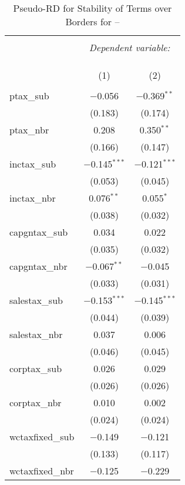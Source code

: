 
\begin{table}[!htbp] \centering 
  \caption{Pseudo-RD for Stability of Terms over Borders for  --} 
  \label{} 
\begin{tabular}{@{\extracolsep{5pt}}lcc} 
\\[-1.8ex]\hline 
\hline \\[-1.8ex] 
 & \multicolumn{2}{c}{\textit{Dependent variable:}} \\ 
\cline{2-3} 
\\[-1.8ex] & \multicolumn{2}{c}{ } \\ 
\\[-1.8ex] & (1) & (2)\\ 
\hline \\[-1.8ex] 
 ptax\_sub & $-$0.056 & $-$0.369$^{**}$ \\ 
  & (0.183) & (0.174) \\ 
  ptax\_nbr & 0.208 & 0.350$^{**}$ \\ 
  & (0.166) & (0.147) \\ 
  inctax\_sub & $-$0.145$^{***}$ & $-$0.121$^{***}$ \\ 
  & (0.053) & (0.045) \\ 
  inctax\_nbr & 0.076$^{**}$ & 0.055$^{*}$ \\ 
  & (0.038) & (0.032) \\ 
  capgntax\_sub & 0.034 & 0.022 \\ 
  & (0.035) & (0.032) \\ 
  capgntax\_nbr & $-$0.067$^{**}$ & $-$0.045 \\ 
  & (0.033) & (0.031) \\ 
  salestax\_sub & $-$0.153$^{***}$ & $-$0.145$^{***}$ \\ 
  & (0.044) & (0.039) \\ 
  salestax\_nbr & 0.037 & 0.006 \\ 
  & (0.046) & (0.045) \\ 
  corptax\_sub & 0.026 & 0.029 \\ 
  & (0.026) & (0.026) \\ 
  corptax\_nbr & 0.010 & 0.002 \\ 
  & (0.024) & (0.024) \\ 
  wctaxfixed\_sub & $-$0.149 & $-$0.121 \\ 
  & (0.133) & (0.117) \\ 
  wctaxfixed\_nbr & $-$0.125 & $-$0.229 \\ 

\end{tabular}
\end{table}
